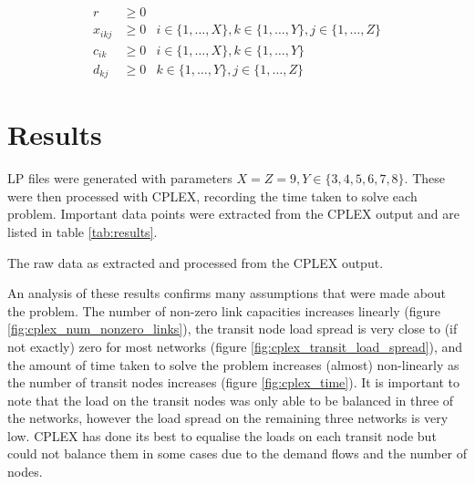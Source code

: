 \documentclass[12pt]{article} %
\begin{document}
\begin{align}
\label{eq:obj_function_nn}
r &\geq 0 \\[1em]
\label{eq:decision_var_nn}
x_{ikj} &\geq 0 & i \in \{1, \ldots, X\}, k \in \{1, \ldots, Y\}, j \in \{1, \ldots, Z\} \\[1em]
\label{eq:source_capacity_nn}
c_{ik} &\geq 0 & i \in \{1, \ldots, X\}, k \in \{1, \ldots, Y\} \\[1em]
\label{eq:dest_capacity_nn}
d_{kj} &\geq 0 & k \in \{1, \ldots, Y\}, j \in \{1, \ldots, Z\}
\end{align}

\section{Results}

LP files were generated with parameters $X = Z = 9, Y \in \{3, 4, 5, 6, 7, 8\}$. These were then processed with CPLEX, recording the time taken to solve each problem. Important data points were extracted from the CPLEX output and are listed in table \ref{tab:results}.

\begin{table}[H]
	\centering
	\caption{The raw data as extracted and processed from the CPLEX output.}
	\label{tab:results}
\end{table}

\noindent An analysis of these results confirms many assumptions that were made about the problem. The number of non-zero link capacities increases linearly (figure \ref{fig:cplex_num_nonzero_links}), the transit node load spread is very close to (if not exactly) zero for most networks (figure \ref{fig:cplex_transit_load_spread}), and the amount of time taken to solve the problem increases (almost) non-linearly as the number of transit nodes increases (figure \ref{fig:cplex_time}). It is important to note that the load on the transit nodes was only able to be balanced in three of the networks, however the load spread on the remaining three networks is very low. CPLEX has done its best to equalise the loads on each transit node but could not balance them in some cases due to the demand flows and the number of nodes. \\
\end{document}

